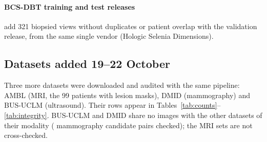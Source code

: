 \documentclass[11pt]{article}
\begin{document}
\paragraph{BCS-DBT training and test releases} add 321 biopsied views without
duplicates or patient overlap with the validation release, from the same
single vendor (Hologic Selenia Dimensions).

\subsection{Datasets added 19--22 October}
\label{sec:new2}

Three more datasets were downloaded and audited with the same pipeline:
AMBL (MRI, the 99 patients with lesion masks), DMID (mammography) and BUS-UCLM
(ultrasound). Their rows appear in Tables~\ref{tab:counts}--\ref{tab:integrity}.
BUS-UCLM and DMID share no images with the other datasets of their modality
(\mgCrossCandidates{} mammography candidate pairs checked); the MRI sets are not
cross-checked.
\end{document}
